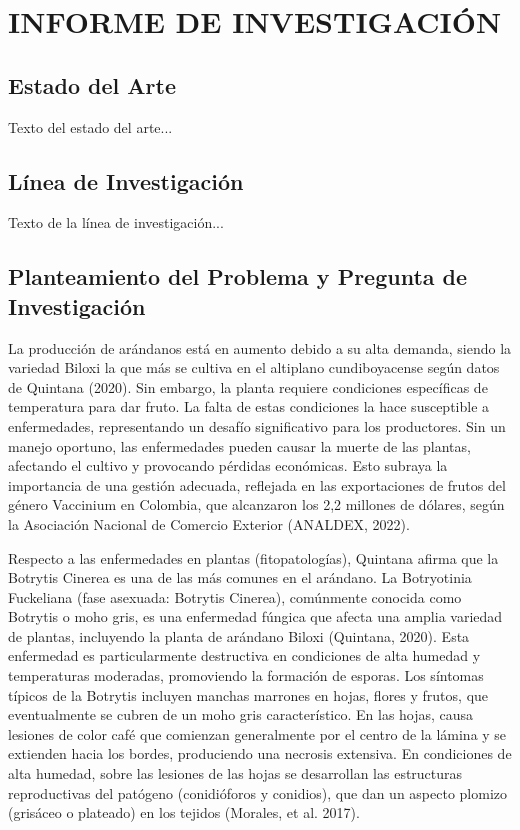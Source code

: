 \doublespacing
\chapter{INFORME DE INVESTIGACIÓN}

\section{Estado del Arte}
Texto del estado del arte...

\section{Línea de Investigación}
Texto de la línea de investigación...

\section{Planteamiento del Problema y Pregunta de Investigación}
La producción de arándanos está en aumento debido a su alta demanda, siendo la variedad Biloxi la que más se cultiva en el altiplano cundiboyacense según datos de Quintana (2020). Sin embargo, la planta requiere condiciones específicas de temperatura para dar fruto. La falta de estas condiciones la hace susceptible a enfermedades, representando un desafío significativo para los productores. Sin un manejo oportuno, las enfermedades pueden causar la muerte de las plantas, afectando el cultivo y provocando pérdidas económicas. Esto subraya la importancia de una gestión adecuada, reflejada en las exportaciones de frutos del género Vaccinium en Colombia, que alcanzaron los 2,2 millones de dólares, según la Asociación Nacional de Comercio Exterior (ANALDEX, 2022).

\bigskip
Respecto a las enfermedades en plantas (fitopatologías), Quintana afirma que la Botrytis Cinerea es una de las más comunes en el arándano. La Botryotinia Fuckeliana (fase asexuada: Botrytis Cinerea), comúnmente conocida como Botrytis o moho gris, es una enfermedad fúngica que afecta una amplia variedad de plantas, incluyendo la planta de arándano Biloxi (Quintana, 2020). Esta enfermedad es particularmente destructiva en condiciones de alta humedad y temperaturas moderadas, promoviendo la formación de esporas. Los síntomas típicos de la Botrytis incluyen manchas marrones en hojas, flores y frutos, que eventualmente se cubren de un moho gris característico. En las hojas, causa lesiones de color café que comienzan generalmente por el centro de la lámina y se extienden hacia los bordes, produciendo una necrosis extensiva. En condiciones de alta humedad, sobre las lesiones de las hojas se desarrollan las estructuras reproductivas del patógeno (conidióforos y conidios), que dan un aspecto plomizo (grisáceo o plateado) en los tejidos (Morales, et al. 2017).

